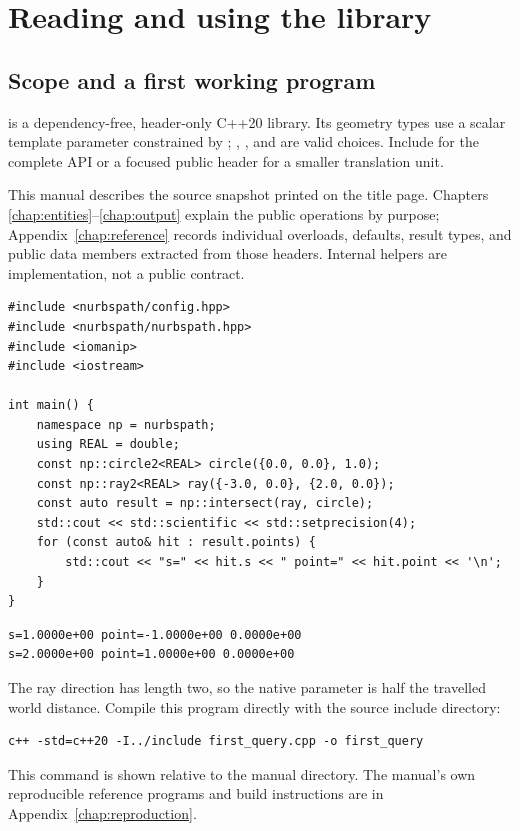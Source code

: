 \chapter{Reading and using the library}\label{chap:foundations}
\section{Scope and a first working program}
 is a dependency-free, header-only C++20 library. Its geometry
types use a scalar template parameter constrained by ;
, , and  are valid choices. Include
 for the complete API or a focused public header
for a smaller translation unit.

This manual describes the source snapshot printed on the title page. Chapters
\ref{chap:entities}--\ref{chap:output} explain the public operations by purpose;
Appendix~\ref{chap:reference} records individual overloads, defaults, result
types, and public data members extracted from those headers. Internal
 helpers are implementation, not a public contract.

\begin{lstlisting}
#include <nurbspath/config.hpp>
#include <nurbspath/nurbspath.hpp>
#include <iomanip>
#include <iostream>

int main() {
    namespace np = nurbspath;
    using REAL = double;
    const np::circle2<REAL> circle({0.0, 0.0}, 1.0);
    const np::ray2<REAL> ray({-3.0, 0.0}, {2.0, 0.0});
    const auto result = np::intersect(ray, circle);
    std::cout << std::scientific << std::setprecision(4);
    for (const auto& hit : result.points) {
        std::cout << "s=" << hit.s << " point=" << hit.point << '\n';
    }
}
\end{lstlisting}
\begin{lstlisting}[style=plain]
s=1.0000e+00 point=-1.0000e+00 0.0000e+00
s=2.0000e+00 point=1.0000e+00 0.0000e+00
\end{lstlisting}
The ray direction has length two, so the native parameter is half the travelled
world distance. Compile this program directly with the source include directory:
\begin{lstlisting}[style=plain]
c++ -std=c++20 -I../include first_query.cpp -o first_query
\end{lstlisting}
This command is shown relative to the manual directory. The manual's own
reproducible reference programs and build instructions are in
Appendix~\ref{chap:reproduction}.

